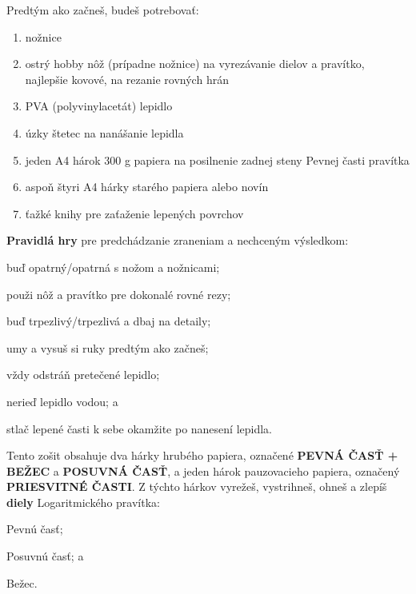   \begin{multicols*}{3}
  \normalsize{Predtým ako začneš, budeš potrebovať:
    \begin{enumerate}
      \setlength{\parskip}{0pt}
      \setlength{\parsep}{0pt}
      \item nožnice
      \item ostrý hobby nôž (prípadne nožnice) na vyrezávanie dielov a pravítko, najlepšie kovové, na rezanie rovných hrán
      \item PVA (polyvinylacetát) lepidlo
      \item úzky štetec na nanášanie lepidla
      \item jeden A4 hárok 300 g papiera na posilnenie zadnej steny Pevnej časti pravítka
      \item aspoň štyri A4 hárky starého papiera alebo novín
      \item ťažké knihy pre zaťaženie lepených povrchov
    \end{enumerate}

  \textbf{Pravidlá hry} pre predchádzanie zraneniam a nechceným výsledkom:
    \begin{inparaenum}
      \item buď opatrný/opatrná s nožom a nožnicami;
      \item použi nôž a pravítko pre dokonalé rovné rezy;
      \item buď trpezlivý/trpezlivá a dbaj na detaily;
      \item umy a vysuš si ruky predtým ako začneš;
      \item vždy odstráň pretečené lepidlo;
      \item nerieď lepidlo vodou; a
      \item stlač lepené časti k sebe okamžite po nanesení lepidla.
    \end{inparaenum}

  Tento zošit obsahuje dva hárky hrubého papiera, označené \textbf{PEVNÁ ČASŤ + BEŽEC} a \textbf{POSUVNÁ ČASŤ}, a jeden hárok pauzovacieho papiera, označený \textbf{PRIESVITNÉ ČASTI}. Z týchto hárkov vyrežeš, vystrihneš, ohneš a zlepíš \textbf{diely} Logaritmického pravítka:
    \begin{inparaenum}
      \item Pevnú časť;
      \item Posuvnú časť; a
      \item Bežec.
    \end{inparaenum}

}
\end{multicols*}

